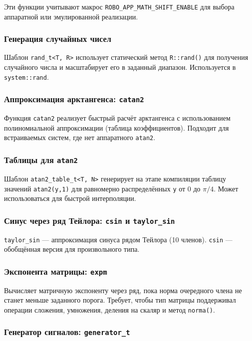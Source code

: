 \documentclass[a4paper,12pt]{article}
\begin{document}
Эти функции учитывают макрос \texttt{ROBO\_APP\_MATH\_SHIFT\_ENABLE} для выбора аппаратной или эмулированной реализации.

\subsubsection{Генерация случайных чисел}

Шаблон \texttt{rand\_t<T, R>} использует статический метод \texttt{R::rand()} для получения случайного числа и масштабирует его в заданный диапазон. Используется в \texttt{system::rand}.

\subsubsection{Аппроксимация арктангенса: \texttt{catan2}}

Функция \texttt{catan2} реализует быстрый расчёт арктангенса с использованием полиномиальной аппроксимации (таблица коэффициентов). Подходит для встраиваемых систем, где нет аппаратного \texttt{atan2}.

\subsubsection{Таблицы для \texttt{atan2}}

Шаблон \texttt{atan2\_table\_t<T, N>} генерирует на этапе компиляции таблицу значений \texttt{atan2(y,1)} для равномерно распределённых \texttt{y} от 0 до $\pi/4$. Может использоваться для быстрой интерполяции.

\subsubsection{Синус через ряд Тейлора: \texttt{csin} и \texttt{taylor\_sin}}

\texttt{taylor\_sin} — аппроксимация синуса рядом Тейлора (10 членов). \texttt{csin} — обобщённая версия для произвольного типа.

\subsubsection{Экспонента матрицы: \texttt{expm}}

Вычисляет матричную экспоненту через ряд, пока норма очередного члена не станет меньше заданного порога. Требует, чтобы тип матрицы поддерживал операции сложения, умножения, деления на скаляр и метод \texttt{norma()}.

\subsubsection{Генератор сигналов: \texttt{generator\_t}}
\end{document}
